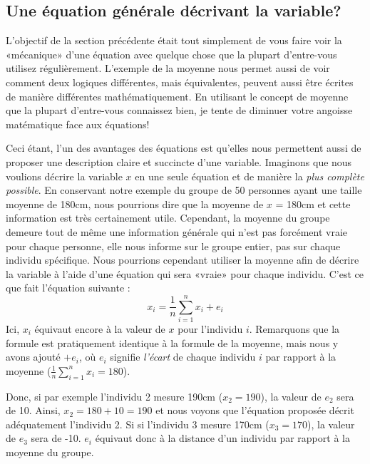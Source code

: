 \documentclass[
]{book}
\begin{document}
\hypertarget{une-uxe9quation-guxe9nuxe9rale-duxe9crivant-la-variable}{%
\subsection{Une équation générale décrivant la variable?}\label{une-uxe9quation-guxe9nuxe9rale-duxe9crivant-la-variable}}

L'objectif de la section précédente était tout simplement de vous faire voir la «mécanique» d'une équation avec quelque chose que la plupart d'entre-vous utilisez régulièrement. L'exemple de la moyenne nous permet aussi de voir comment deux logiques différentes, mais équivalentes, peuvent aussi être écrites de manière différentes mathématiquement. En utilisant le concept de moyenne que la plupart d'entre-vous connaissez bien, je tente de diminuer votre angoisse \citep{tobias1993} matématique face aux équations!

Ceci étant, l'un des avantages des équations est qu'elles nous permettent aussi de proposer une description claire et succincte d'une variable. Imaginons que nous voulions décrire la variable \(x\) en une seule équation et de manière la \emph{plus complète possible}. En conservant notre exemple du groupe de 50 personnes ayant une taille moyenne de 180cm, nous pourrions dire que la moyenne de \(x\) = 180cm et cette information est très certainement utile. Cependant, la moyenne du groupe demeure tout de même une information générale qui n'est pas forcément vraie pour chaque personne, elle nous informe sur le groupe entier, pas sur chaque individu spécifique. Nous pourrions cependant utiliser la moyenne afin de décrire la variable à l'aide d'une équation qui sera «vraie» pour chaque individu. C'est ce que fait l'équation suivante :
\[x_i= \frac { 1 }{ n } \sum_{ i=1 }^{ n }{ x_i } + e_i\]
Ici, \(x_i\) équivaut encore à la valeur de \(x\) pour l'individu \(i\). Remarquons que la formule est pratiquement identique à la formule de la moyenne, mais nous y avons ajouté \(+ e_i\), où \(e_i\) signifie \emph{l'écart} de chaque individu \(i\) par rapport à la moyenne (\(\frac { 1 }{ n } \sum_{ i=1 }^{ n }{ x_i } = 180\)).

Donc, si par exemple l'individu 2 mesure 190cm (\(x_2 = 190\)), la valeur de \(e_2\) sera de 10. Ainsi, \(x_2 = 180 + 10 = 190\) et nous voyons que l'équation proposée décrit adéquatement l'individu 2. Si si l'individu 3 mesure 170cm (\(x_3 = 170\)), la valeur de \(e_3\) sera de -10. \(e_i\) équivaut donc à la distance d'un individu par rapport à la moyenne du groupe.
\end{document}
